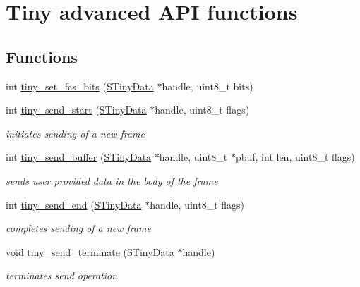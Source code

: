 \hypertarget{group__ADVANCED__API}{}\section{Tiny advanced A\+P\+I functions}
\label{group__ADVANCED__API}
\subsection*{Functions}
\begin{DoxyCompactItemize}
\item 
int \hyperlink{group__ADVANCED__API_ga5e66725a2818491d4e2b1134951d9229}{tiny\+\_\+set\+\_\+fcs\+\_\+bits} (\hyperlink{structSTinyData}{S\+Tiny\+Data} $\ast$handle, uint8\+\_\+t bits)
\item 
int \hyperlink{group__ADVANCED__API_ga159189fa29f3eaa79a76a3fa87b31084}{tiny\+\_\+send\+\_\+start} (\hyperlink{structSTinyData}{S\+Tiny\+Data} $\ast$handle, uint8\+\_\+t flags)
\begin{DoxyCompactList}\small\item\em initiates sending of a new frame \end{DoxyCompactList}\item 
int \hyperlink{group__ADVANCED__API_gabe04a4e76adc5421deac4e3699a15646}{tiny\+\_\+send\+\_\+buffer} (\hyperlink{structSTinyData}{S\+Tiny\+Data} $\ast$handle, uint8\+\_\+t $\ast$pbuf, int len, uint8\+\_\+t flags)
\begin{DoxyCompactList}\small\item\em sends user provided data in the body of the frame \end{DoxyCompactList}\item 
int \hyperlink{group__ADVANCED__API_ga2e85c7e9efb0bbe9c6adfd923ec7c73c}{tiny\+\_\+send\+\_\+end} (\hyperlink{structSTinyData}{S\+Tiny\+Data} $\ast$handle, uint8\+\_\+t flags)
\begin{DoxyCompactList}\small\item\em completes sending of a new frame \end{DoxyCompactList}\item 
void \hyperlink{group__ADVANCED__API_ga73c9f1cfb0948bd559d3704749db540b}{tiny\+\_\+send\+\_\+terminate} (\hyperlink{structSTinyData}{S\+Tiny\+Data} $\ast$handle)
\begin{DoxyCompactList}\small\item\em terminates send operation \end{DoxyCompactList}\item 

\end{DoxyCompactItemize}
